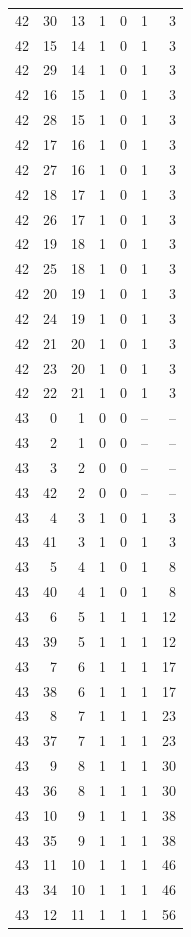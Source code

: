 \begin{longtable}{rrrrrrr}
42 & 30 & 13 & 1 & 0 & 1 & 3\\
42 & 15 & 14 & 1 & 0 & 1 & 3\\
42 & 29 & 14 & 1 & 0 & 1 & 3\\
42 & 16 & 15 & 1 & 0 & 1 & 3\\
42 & 28 & 15 & 1 & 0 & 1 & 3\\
42 & 17 & 16 & 1 & 0 & 1 & 3\\
42 & 27 & 16 & 1 & 0 & 1 & 3\\
42 & 18 & 17 & 1 & 0 & 1 & 3\\
42 & 26 & 17 & 1 & 0 & 1 & 3\\
42 & 19 & 18 & 1 & 0 & 1 & 3\\
42 & 25 & 18 & 1 & 0 & 1 & 3\\
42 & 20 & 19 & 1 & 0 & 1 & 3\\
42 & 24 & 19 & 1 & 0 & 1 & 3\\
42 & 21 & 20 & 1 & 0 & 1 & 3\\
42 & 23 & 20 & 1 & 0 & 1 & 3\\
42 & 22 & 21 & 1 & 0 & 1 & 3\\
43 & 0 & 1 & 0 & 0 & -- & --\\
43 & 2 & 1 & 0 & 0 & -- & --\\
43 & 3 & 2 & 0 & 0 & -- & --\\
43 & 42 & 2 & 0 & 0 & -- & --\\
43 & 4 & 3 & 1 & 0 & 1 & 3\\
43 & 41 & 3 & 1 & 0 & 1 & 3\\
43 & 5 & 4 & 1 & 0 & 1 & 8\\
43 & 40 & 4 & 1 & 0 & 1 & 8\\
43 & 6 & 5 & 1 & 1 & 1 & 12\\
43 & 39 & 5 & 1 & 1 & 1 & 12\\
43 & 7 & 6 & 1 & 1 & 1 & 17\\
43 & 38 & 6 & 1 & 1 & 1 & 17\\
43 & 8 & 7 & 1 & 1 & 1 & 23\\
43 & 37 & 7 & 1 & 1 & 1 & 23\\
43 & 9 & 8 & 1 & 1 & 1 & 30\\
43 & 36 & 8 & 1 & 1 & 1 & 30\\
43 & 10 & 9 & 1 & 1 & 1 & 38\\
43 & 35 & 9 & 1 & 1 & 1 & 38\\
43 & 11 & 10 & 1 & 1 & 1 & 46\\
43 & 34 & 10 & 1 & 1 & 1 & 46\\
43 & 12 & 11 & 1 & 1 & 1 & 56\\

\end{longtable}

